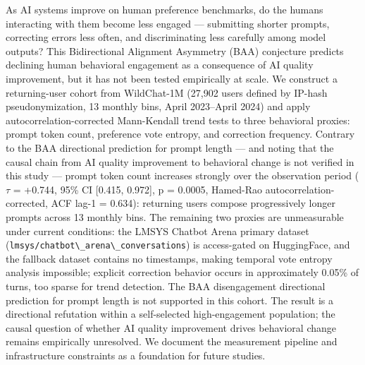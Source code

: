 
As AI systems improve on human preference benchmarks, do the humans interacting with them become less engaged --- submitting shorter prompts, correcting errors less often, and discriminating less carefully among model outputs? This Bidirectional Alignment Asymmetry (BAA) conjecture predicts declining human behavioral engagement as a consequence of AI quality improvement, but it has not been tested empirically at scale. We construct a returning-user cohort from WildChat-1M (27,902 users defined by IP-hash pseudonymization, 13 monthly bins, April 2023--April 2024) and apply autocorrelation-corrected Mann-Kendall trend tests to three behavioral proxies: prompt token count, preference vote entropy, and correction frequency. Contrary to the BAA directional prediction for prompt length --- and noting that the causal chain from AI quality improvement to behavioral change is not verified in this study --- prompt token count increases strongly over the observation period ($\tau$ = +0.744, 95\% CI [0.415, 0.972], p = 0.0005, Hamed-Rao autocorrelation-corrected, ACF lag-1 = 0.634): returning users compose progressively longer prompts across 13 monthly bins. The remaining two proxies are unmeasurable under current conditions: the LMSYS Chatbot Arena primary dataset (\texttt{lmsys/chatbot\textbackslash \_arena\textbackslash \_conversations}) is access-gated on HuggingFace, and the fallback dataset contains no timestamps, making temporal vote entropy analysis impossible; explicit correction behavior occurs in approximately 0.05\% of turns, too sparse for trend detection. The BAA disengagement directional prediction for prompt length is not supported in this cohort. The result is a directional refutation within a self-selected high-engagement population; the causal question of whether AI quality improvement drives behavioral change remains empirically unresolved. We document the measurement pipeline and infrastructure constraints as a foundation for future studies.

